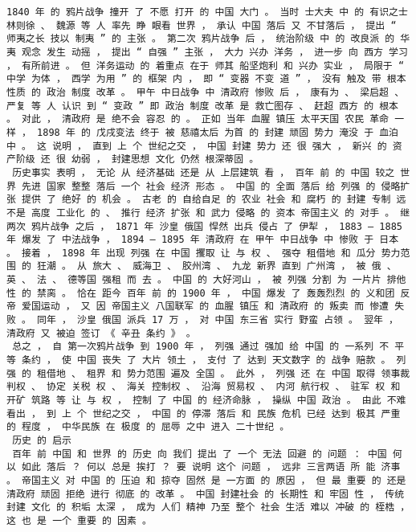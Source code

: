 \documentclass{article}
\begin{document}
\begin{Verbatim}[commandchars=\\\{\}]
 1840 年 的 鸦片战争 撞开 了 不愿 打开 的 中国 大门 。 当时 士大夫 中 的 有识之士 林则徐 、 魏源 等 人 率先 睁 眼看 世界 ， 承认 中国 落后 又 不甘落后 ， 提出 “ 师夷之长 技以 制夷 ” 的 主张 。 第二次 鸦片战争 后 ， 统治阶级 中 的 改良派 的 华夷 观念 发生 动摇 ， 提出 “ 自强 ” 主张 ， 大力 兴办 洋务 ， 进一步 向 西方 学习 ， 有所前进 。 但 洋务运动 的 着重点 在于 师其 船坚炮利 和 兴办 实业 ， 局限于 “ 中学 为体 ， 西学 为用 ” 的 框架 内 ， 即 “ 变器 不变 道 ” ， 没有 触及 带 根本 性质 的 政治 制度 改革 。 甲午 中日战争 中 清政府 惨败 后 ， 康有为 、 梁启超 、 严复 等 人 认识 到 “ 变政 ” 即 政治 制度 改革 是 救亡图存 、 赶超 西方 的 根本 。 对此 ， 清政府 是 绝不会 容忍 的 。 正如 当年 血腥 镇压 太平天国 农民 革命 一样 ， 1898 年 的 戊戌变法 终于 被 慈禧太后 为首 的 封建 顽固 势力 淹没 于 血泊 中 。 这 说明 ， 直到 上 个 世纪之交 ， 中国 封建 势力 还 很 强大 ， 新兴 的 资产阶级 还 很 幼弱 ， 封建思想 文化 仍然 根深蒂固 。 
 历史事实 表明 ， 无论 从 经济基础 还是 从 上层建筑 看 ， 百年 前 的 中国 较之 世界 先进 国家 整整 落后 一个 社会 经济 形态 。 中国 的 全面 落后 给 列强 的 侵略扩张 提供 了 绝好 的 机会 。 古老 的 自给自足 的 农业 社会 和 腐朽 的 封建 专制 远 不是 高度 工业化 的 、 推行 经济 扩张 和 武力 侵略 的 资本 帝国主义 的 对手 。 继 两次 鸦片战争 之后 ， 1871 年 沙皇 俄国 悍然 出兵 侵占 了 伊犁 ， 1883 — 1885 年 爆发 了 中法战争 ， 1894 — 1895 年 清政府 在 甲午 中日战争 中 惨败 于 日本 。 接着 ， 1898 年 出现 列强 在 中国 攫取 让 与 权 、 强夺 租借地 和 瓜分 势力范围 的 狂潮 。 从 旅大 、 威海卫 、 胶州湾 、 九龙 新界 直到 广州湾 ， 被 俄 、 英 、 法 、 德等国 强租 而 去 。 中国 的 大好河山 ， 被 列强 分割 为 一片片 排他性 的 禁脔 。 恰在 距今 百年 前 的 1900 年 ， 中国 爆发 了 轰轰烈烈 的 义和团 反帝 爱国运动 ， 又 因 帝国主义 八国联军 的 血腥 镇压 和 清政府 的 叛卖 而 惨遭 失败 。 同年 ， 沙皇 俄国 派兵 17 万 ， 对 中国 东三省 实行 野蛮 占领 。 翌年 ， 清政府 又 被迫 签订 《 辛丑 条约 》 。 
 总之 ， 自 第一次鸦片战争 到 1900 年 ， 列强 通过 强加 给 中国 的 一系列 不 平等 条约 ， 使 中国 丧失 了 大片 领土 ， 支付 了 达到 天文数字 的 战争 赔款 。 列强 的 租借地 、 租界 和 势力范围 遍及 全国 。 此外 ， 列强 还 在 中国 取得 领事裁判权 、 协定 关税 权 、 海关 控制权 、 沿海 贸易权 、 内河 航行权 、 驻军 权 和 开矿 筑路 等 让 与 权 ， 控制 了 中国 的 经济命脉 ， 操纵 中国 政治 。 由此 不难看出 ， 到 上 个 世纪之交 ， 中国 的 停滞 落后 和 民族 危机 已经 达到 极其 严重 的 程度 ， 中华民族 在 极度 的 屈辱 之中 进入 二十世纪 。 
 历史 的 启示 
 百年 前 中国 和 世界 的 历史 向 我们 提出 了 一个 无法 回避 的 问题 ： 中国 何以 如此 落后 ？ 何以 总是 挨打 ？ 要 说明 这个 问题 ， 远非 三言两语 所 能 济事 。 帝国主义 对 中国 的 压迫 和 掠夺 固然 是 一方面 的 原因 ， 但 最 重要 的 还是 清政府 顽固 拒绝 进行 彻底 的 改革 。 中国 封建社会 的 长期性 和 牢固 性 ， 传统 封建 文化 的 积垢 太深 ， 成为 人们 精神 乃至 整个 社会 生活 难以 冲破 的 桎梏 ， 这 也 是 一个 重要 的 因素 。 

\end{Verbatim}
\end{document}
